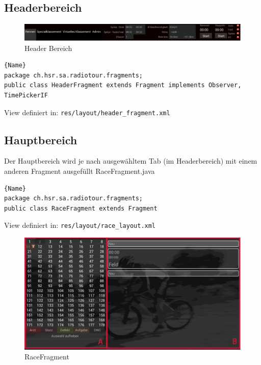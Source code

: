 \subsection{Headerbereich}

\begin{figure}[h!]
\caption{Header Bereich}
\centering
\includegraphics[scale=0.9]{07anhang/images/dev_header.png}
\end{figure}


\begin{lstlisting}{Name}
package ch.hsr.sa.radiotour.fragments;
public class HeaderFragment extends Fragment implements Observer, TimePickerIF
\end{lstlisting}

View definiert in:
\lstinline|res/layout/header_fragment.xml|

\subsection{Hauptbereich}
Der Hauptbereich wird je nach ausgewähltem Tab (im Headerbereich) mit einem anderen Fragment ausgefüllt
RaceFragment.java

\begin{lstlisting}{Name}
package ch.hsr.sa.radiotour.fragments;
public class RaceFragment extends Fragment 
\end{lstlisting}


View definiert in:
\lstinline|res/layout/race_layout.xml|

\begin{figure}[h!]
\caption{RaceFragment}
\centering
\includegraphics[scale=0.9]{07anhang/images/dev_racefragment.png}
\end{figure}

